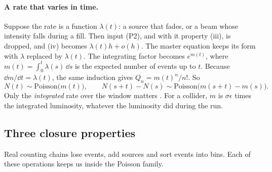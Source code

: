 \paragraph{A rate that varies in time.} Suppose the rate is a function $\lambda(t)$: a source that fades, or a beam whose intensity falls during a fill. Then input (P2), and with it property (iii), is dropped, and (iv) becomes $\lambda(t)h+o(h)$. The master equation keeps its form with $\lambda$ replaced by $\lambda(t)$. The integrating factor becomes $e^{m(t)}$, where $m(t)=\int_0^t\lambda(s)\,\dd s$ is the expected number of events up to $t$. Because $\dd m/\dd t=\lambda(t)$, the same induction gives $Q_n=m(t)^n/n!$. So
\[
  N(t)\sim\mathrm{Poisson}\bigl(m(t)\bigr),\qquad N(s+t)-N(s)\sim\mathrm{Poisson}\bigl(m(s+t)-m(s)\bigr).
\]
Only the \emph{integrated} rate over the window matters . For a collider, $m$ is $\sigma\epsilon$ times the integrated luminosity, whatever the luminosity did during the run.

\subsection{Three closure properties}

Real counting chains lose events, add sources and sort events into bins. Each of these operations keeps us inside the Poisson family.

